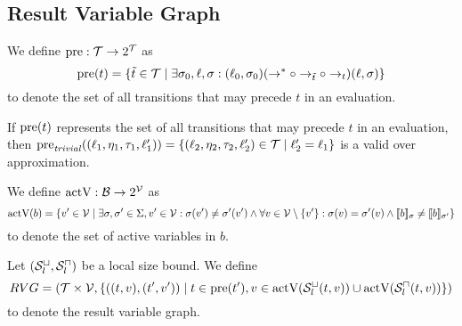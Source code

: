 \subsection{Result Variable Graph}


\begin{definition} 
  We define $\text{pre}: \mathcal{T} \rightarrow 2^{\mathcal{T}}$ as
  \[\text{pre}(t) = \lbrace \tilde{t} \in \mathcal{T} \mid \exists \sigma_0, \ell, \sigma: (\ell_0, \sigma_0) (\rightarrow^* \circ \rightarrow_{\tilde{t}} \circ \rightarrow_{t}) (\ell, \sigma) \rbrace\]
  to denote the set of all transitions that may precede $t$ in an evaluation.	
\end{definition}

If $\text{pre}(t)$ represents the set of all transitions that may precede $t$ in an evaluation, then $\text{pre}_{\mathit{trivial}}((\ell_1, \eta_1, \tau_1, \ell_1')) = \lbrace (\ell_2, \eta_2, \tau_2, \ell_2') \in \mathcal{T} \mid \ell_2' = \ell_1 \rbrace$ is a valid over approximation.


\begin{definition} 
	We define $\text{actV}: \mathcal{B} \rightarrow 2^{\mathcal{V}}$ as 
	\[ \text{actV}(b) = \lbrace  v' \in \mathcal{V} \mid \exists \sigma, \sigma' \in \Sigma, v' \in \mathcal{V}: \sigma(v') \neq \sigma'(v') \wedge \forall v \in \mathcal{V} \setminus \lbrace v' \rbrace: \sigma(v) = \sigma'(v) \wedge \llbracket b \rrbracket_{\sigma} \neq \llbracket b \rrbracket_{\sigma'} \rbrace \]
	to denote the set of active variables in $b$.
\end{definition}

\begin{definition}
	Let ${({\mathcal{S}^\sqcup_l}, {\mathcal{S}^\sqcap_l})}$ be a local size bound.
	We define 
	\[ RVG = (\mathcal{T} \times \mathcal{V}, \lbrace ((t, v), (t', v')) \mid t \in \text{pre}(t'), v \in \text{actV}({\mathcal{S}^\sqcup_l}(t,v)) \cup \text{actV}({\mathcal{S}^\sqcap_l}(t,v)) \rbrace) \]
	to denote the result variable graph.
\end{definition}
